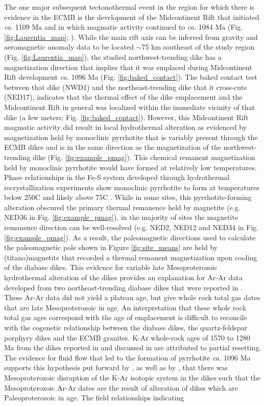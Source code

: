 \documentclass[draft]{agujournal2019}
\begin{document}
The one major subsequent tectonothermal event in the region for which there is evidence in the ECMB is the development of the Midcontinent Rift that initiated \textit{ca.} 1109 Ma and in which magmatic activity continued to \textit{ca.} 1084 Ma (Fig. \ref{fig:Laurentia_map}; ). While the main rift axis can be inferred from gravity and aeromagnetic anomaly data to be located $\sim$75 km southeast of the study region (Fig. \ref{fig:Laurentia_map}), the studied northwest-trending dike has a magnetization direction that implies that it was emplaced during Midcontinent Rift development \textit{ca.} 1096 Ma (Fig. \ref{fig:baked_contact}). The baked contact test between that dike (NWD1) and the northeast-trending dike that it cross-cuts (NED17), indicates that the thermal effect of the dike emplacement and the Midcontinent Rift in general was localized within the immediate vicinity of that dike (a few meters; Fig. \ref{fig:baked_contact}). However, this Midcontinent Rift magmatic activity did result in local hydrothermal alteration as evidenced by magnetization held by monoclinic pyrrhotite that is variably present through the ECMB dikes and is in the same direction as the magnetization of the northwest-trending dike (Fig. \ref{fig:example_pmag}). This chemical remanent magnetization held by monoclinic pyrrhotite would have formed at relatively low temperatures. Phase relationships in the Fe-S system developed through hydrothermal recrystallization experiments show monoclinic pyrrhotite to form at temperatures below 250\textdegree C and likely above 75\textdegree C \cite{Kissin1982a}. While in some sites, this pyrrhotite-forming alteration obscured the primary thermal remanence held by magnetite (e.g. NED36 in Fig. \ref{fig:example_pmag}), in the majority of sites the magnetite remanence direction can be well-resolved (e.g. NED2, NED12 and NED34 in Fig. \ref{fig:example_pmag}). As a result, the paleomagnetic directions used to calculate the paleomagnetic pole shown in Figure \ref{fig:site_means} are held by (titano)magnetite that recorded a thermal remanent magnetization upon cooling of the diabase dikes. This evidence for variable late Mesoproterozoic hydrothermal alteration of the dikes provides an explanation for Ar-Ar data developed from two northeast-trending diabase dikes that were reported in . These Ar-Ar data did not yield a plateau age, but give whole rock total gas dates that are late Mesoproterozoic in age. An interpretation that these whole rock total gas ages correspond with the age of emplacement is difficult to reconcile with the cogenetic relationship between the diabase dikes, the quartz-feldspar porphyry dikes and the ECMB granites. K-Ar whole-rock ages of 1570 to 1280 Ma from the dikes reported in  and discussed in  are attributed to partial resetting. The evidence for fluid flow that led to the formation of pyrrhotite \textit{ca.} 1096 Ma supports this hypothesis put forward by , as well as by , that there was Mesoproterozoic disruption of the K-Ar isotopic system in the dikes such that the Mesoproterozoic Ar-Ar dates are the result of alteration of dikes which are Paleoproterozoic in age. The field relationships indicating 
\end{document}

